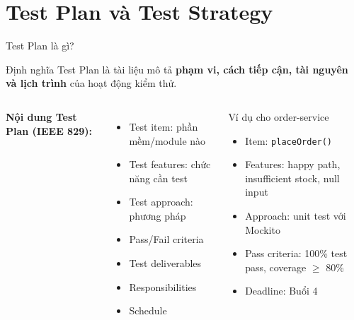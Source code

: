 \documentclass[aspectratio=169,12pt]{beamer}
\begin{document}
\section{Test Plan và Test Strategy}

\begin{frame}{Test Plan là gì?}
  \begin{block}{Định nghĩa}
    Test Plan là tài liệu mô tả \textbf{phạm vi, cách tiếp cận, tài nguyên và lịch trình}
    của hoạt động kiểm thử.
  \end{block}

  \vspace{0.5em}
  \begin{columns}
    \textbf{Nội dung Test Plan (IEEE 829):}
    \begin{itemize}
      \item Test item: phần mềm/module nào
      \item Test features: chức năng cần test
      \item Test approach: phương pháp
      \item Pass/Fail criteria
      \item Test deliverables
      \item Responsibilities
      \item Schedule
    \end{itemize}

    \begin{exampleblock}{Ví dụ cho order-service}
      \begin{itemize}
        \item Item: \texttt{placeOrder()}
        \item Features: happy path, insufficient stock, null input
        \item Approach: unit test với Mockito
        \item Pass criteria: 100\% test pass, coverage $\geq$ 80\%
        \item Deadline: Buổi 4
      \end{itemize}
    \end{exampleblock}
  \end{columns}
\end{frame}
\end{document}
